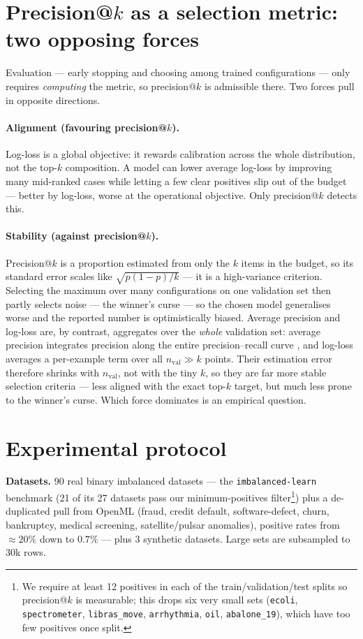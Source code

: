 \documentclass[11pt]{article}
\begin{document}
\section{Precision@$k$ as a selection metric: two opposing forces}\label{sec:selection}
Evaluation --- early stopping and choosing among trained configurations --- only requires
\emph{computing} the metric, so precision@$k$ is admissible there. Two forces pull in
opposite directions.

\paragraph{Alignment (favouring precision@$k$).} Log-loss is a global objective: it rewards
calibration across the whole distribution, not the top-$k$ composition. A model can lower
average log-loss by improving many mid-ranked cases while letting a few clear positives slip
out of the budget --- better by log-loss, worse at the operational objective. Only
precision@$k$ detects this.

\paragraph{Stability (against precision@$k$).} Precision@$k$ is a proportion estimated from
only the $k$ items in the budget, so its standard error scales like
$\sqrt{p(1-p)/k}$ --- it is a high-variance criterion. Selecting the maximum over many
configurations on one validation set then partly selects noise --- the winner's curse
\citep{cawley2010overfitting} --- so the chosen model generalises worse and the reported
number is optimistically biased. Average precision and log-loss are, by contrast, aggregates
over the \emph{whole} validation set: average precision integrates precision along the entire
precision--recall curve \citep{davis2006prroc}, and log-loss averages a per-example term over
all $n_{\text{val}}\gg k$ points. Their estimation error therefore shrinks with $n_{\text{val}}$,
not with the tiny $k$, so they are far more stable selection criteria --- less aligned with the
exact top-$k$ target, but much less prone to the winner's curse. Which force dominates is an
empirical question.

\section{Experimental protocol}\label{sec:protocol}
\textbf{Datasets.} 90 real binary imbalanced datasets --- the \texttt{imbalanced-learn}
benchmark \citep{lemaitre2017imblearn} (21 of its 27 datasets pass our minimum-positives
filter\footnote{We require at least 12 positives in each of the train/validation/test splits
so precision@$k$ is measurable; this drops six very small sets (\texttt{ecoli},
\texttt{spectrometer}, \texttt{libras\_move}, \texttt{arrhythmia}, \texttt{oil},
\texttt{abalone\_19}), which have too few positives once split.}) plus a de-duplicated pull
from OpenML \citep{vanschoren2014openml} (fraud, credit
default, software-defect, churn, bankruptcy, medical screening, satellite/pulsar anomalies),
positive rates from $\approx\!20\%$ down to $0.7\%$ --- plus 3 synthetic datasets. Large sets
are subsampled to $30$k rows.
\end{document}
